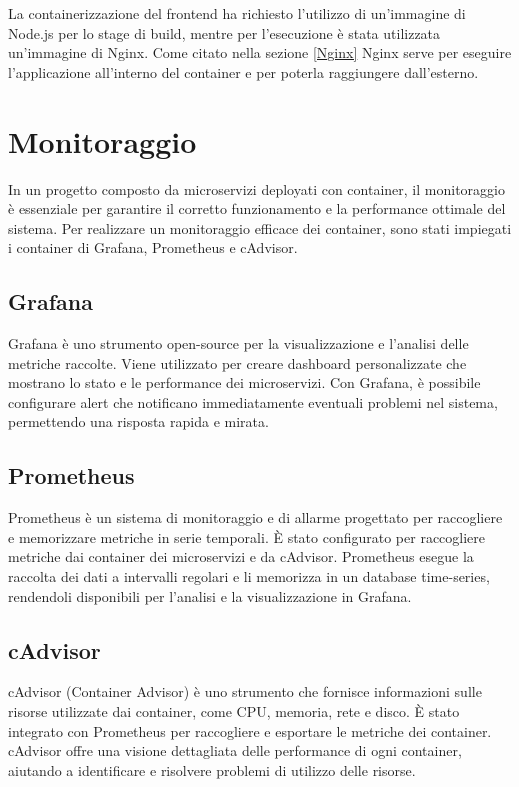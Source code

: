 La containerizzazione del frontend ha richiesto l'utilizzo di un'immagine di Node.js per lo stage di build, mentre per l'esecuzione è stata utilizzata un'immagine di Nginx.
Come citato nella sezione \ref{Nginx} Nginx serve per eseguire l'applicazione all'interno del container e per poterla raggiungere dall'esterno.

\section{Monitoraggio}

In un progetto composto da microservizi deployati con container, il monitoraggio è essenziale per garantire il corretto funzionamento e la performance ottimale del sistema. Per realizzare un monitoraggio efficace dei container, sono stati impiegati i container di Grafana, Prometheus e cAdvisor.

\subsection{Grafana}

Grafana è uno strumento open-source per la visualizzazione e l'analisi delle metriche raccolte. Viene utilizzato per creare dashboard personalizzate che mostrano lo stato e le performance dei microservizi. Con Grafana, è possibile configurare alert che notificano immediatamente eventuali problemi nel sistema, permettendo una risposta rapida e mirata.

\subsection{Prometheus}

Prometheus è un sistema di monitoraggio e di allarme progettato per raccogliere e memorizzare metriche in serie temporali. È stato configurato per raccogliere metriche dai container dei microservizi e da cAdvisor. Prometheus esegue la raccolta dei dati a intervalli regolari e li memorizza in un database time-series, rendendoli disponibili per l'analisi e la visualizzazione in Grafana.

\subsection{cAdvisor}

cAdvisor (Container Advisor) è uno strumento che fornisce informazioni sulle risorse utilizzate dai container, come CPU, memoria, rete e disco. È stato integrato con Prometheus per raccogliere e esportare le metriche dei container. cAdvisor offre una visione dettagliata delle performance di ogni container, aiutando a identificare e risolvere problemi di utilizzo delle risorse.

